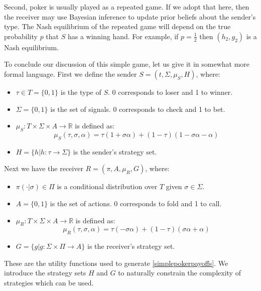 \documentclass{article}
\begin{document}
Second, poker is usually played as a repeated game. If we adopt that here, then the receiver may use Bayesian inference to update prior beliefs about the sender's type. The Nash equilibrium of the repeated game will depend on the true probability $p$ that $S$ has a winning hand. For example, if $p = \frac{1}{2}$ then $(h_2, g_2)$ is a Nash equilibrium.

To conclude our discussion of this simple game, let us give it in somewhat more formal language. First we define the sender $S = (t, \Sigma, \mu_S, H)$, where:
\begin{itemize}
	\item $\tau \in T = \lbrace 0, 1 \rbrace$ is the type of $S$. 0 corresponds to loser and 1 to winner.
	\item $\Sigma = \lbrace 0, 1 \rbrace$ is the set of signals. 0 corresponds to check and 1 to bet.
	\item $\mu_S: T \times \Sigma \times A \longrightarrow \mathbb{R}$ is defined as:
		\begin{equation}
\mu_S(\tau, \sigma, \alpha) = \tau(1+\sigma\alpha) + (1-\tau)(1-\sigma\alpha-\alpha)
		\end{equation}
	\item $H = \lbrace h | h: \tau \rightarrow \Sigma \rbrace$ is the sender's strategy set.
\end{itemize}

\noindent Next we have the receiver $R = (\pi, A, \mu_R, G)$, where:
\begin{itemize}
	\item $\pi(\cdot|\sigma) \in \Pi$ is a conditional distribution over $T$ given $\sigma \in \Sigma$.
	\item $A = \lbrace 0, 1 \rbrace$ is the set of actions. 0 corresponds to fold and 1 to call.
	\item $\mu_R: T \times \Sigma \times A \longrightarrow \mathbb{R}$ is defined as:
		\begin{equation}
\mu_R(\tau, \sigma, \alpha) = \tau(-\sigma\alpha) + (1-\tau)(\sigma\alpha+\alpha)
		\end{equation}
	\item $G = \lbrace g | g: \Sigma \times \Pi \rightarrow A \rbrace$ is the receiver's strategy set.
\end{itemize}

\noindent These are the utility functions used to generate \ref{simplepokerpayoffs}. We introduce the strategy sets $H$ and $G$ to naturally constrain the complexity of strategies which can be used.
\end{document}
